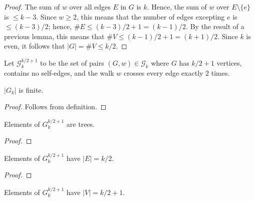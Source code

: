\begin{proof}
  \notready
  The sum of $w$ over all edges $E$ in $G$ is $k$.  Hence, the sum of $w$ over $E\setminus\{e\}$ is $\le k-3$.  Since $w\ge 2$, this means that the number of edges excepting $e$ is $\le (k-3)/2$; hence, $\#E \le (k-3)/2+1 = (k-1)/2$.  By the result of a previous lemma, this means that $\#V \le (k-1)/2+1 = (k+1)/2$.  Since $k$ is even, it follows that $|G|=\#V \le k/2$.
\end{proof}




\begin{definition}
  \label{def:special_set_g}
  \notready
  Let $\mathcal{G}^{k/2+1}_k$ to be the set of pairs $(G,w)\in\mathcal{G}_k$ where $G$ has $k/2+1$ vertices, contains no self-edges, and the walk $w$ crosses every edge exactly $2$ times.
\end{definition}


\begin{lemma}
  \label{lemma:graph_set_finite}
  \notready
  $|G_k|$ is finite.
\end{lemma}

\begin{proof}
  \notready
  Follows from definition.
\end{proof}


\begin{lemma}
  \label{lemma:special_g_tree}
  \notready
  Elements of $G_k^{k/2+1}$ are trees.
\end{lemma}

\begin{proof}
  \notready
\end{proof}

\begin{lemma}
  \label{lemma:special_g_edge_count}
  \notready
  Elements of $G_k^{k/2+1}$ have $|E| = k/2$.
\end{lemma}

\begin{proof}
  \notready
\end{proof}

\begin{lemma}
  \label{lemma:special_g_vertex_count}
  \notready
  Elements of $G_k^{k/2+1}$ have $|V| = k/2 + 1$.
\end{lemma}

